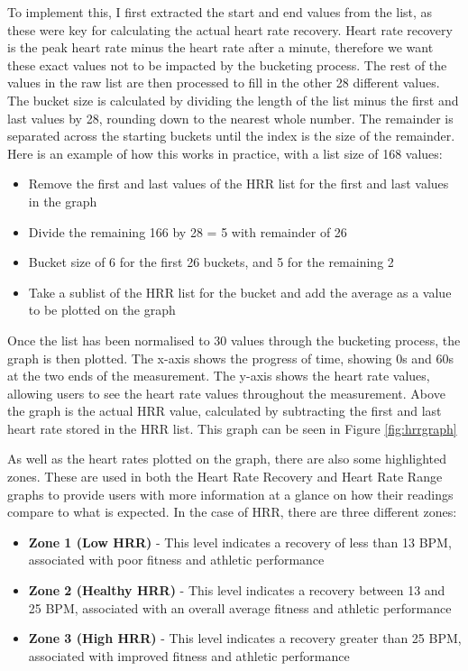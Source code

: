 \documentclass{l4proj}
\begin{document}
To implement this, I first extracted the start and end values from the list, as these were key for calculating the actual heart rate recovery. Heart rate recovery is the peak heart rate minus the heart rate after a minute, therefore we want these exact values not to be impacted by the bucketing process. The rest of the values in the raw list are then processed to fill in the other 28 different values. The bucket size is calculated by dividing the length of the list minus the first and last values by 28, rounding down to the nearest whole number. The remainder is separated across the starting buckets until the index is the size of the remainder. Here is an example of how this works in practice, with a list size of 168 values:

\begin{itemize}
    \item Remove the first and last values of the HRR list for the first and last values in the graph
    \item Divide the remaining 166 by 28 = 5 with remainder of 26
    \item Bucket size of 6 for the first 26 buckets, and 5 for the remaining 2
    \item Take a sublist of the HRR list for the bucket and add the average as a value to be plotted on the graph
\end{itemize}

Once the list has been normalised to 30 values through the bucketing process, the graph is then plotted. The x-axis shows the progress of time, showing 0s and 60s at the two ends of the measurement. The y-axis shows the heart rate values, allowing users to see the heart rate values throughout the measurement. Above the graph is the actual HRR value, calculated by subtracting the first and last heart rate stored in the HRR list. This graph can be seen in Figure \ref{fig:hrrgraph}

As well as the heart rates plotted on the graph, there are also some highlighted zones. These are used in both the Heart Rate Recovery and Heart Rate Range graphs to provide users with more information at a glance on how their readings compare to what is expected. In the case of HRR, there are three different zones:

\begin{itemize}
    \item \textbf{Zone 1 (Low HRR)} - This level indicates a recovery of less than 13 BPM, associated with poor fitness and athletic performance
    \item \textbf{Zone 2 (Healthy HRR)} - This level indicates a recovery between 13 and 25 BPM, associated with an overall average fitness and athletic performance
    \item \textbf{Zone 3 (High HRR)} - This level indicates a recovery greater than 25 BPM, associated with improved fitness and athletic performance
\end{itemize}
\end{document}
